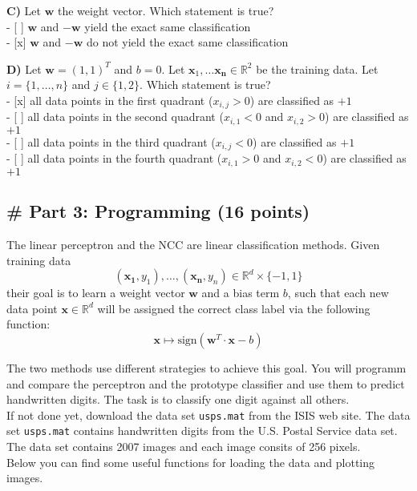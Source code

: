 \documentclass[11pt]{article}
\begin{document}
    \textbf{C)} Let \(\mathbf{w}\) the weight vector. Which statement is
true?\\
- {[} {]} \(\mathbf{w}\) and \(\mathbf{-w}\) yield the exact same
classification\\
- {[}x{]} \(\mathbf{w}\) and \(\mathbf{-w}\) do not yield the exact same
classification

    \textbf{D)} Let \(\mathbf{w} = (1,1)^T\) and \(b = 0\). Let
\(\mathbf{x}_1, \ldots \mathbf{x_n} \in \mathbb{R}^2\) be the training
data. Let \(i = \{1, \ldots ,n \}\) and \(j \in \{1, 2\}\). Which
statement is true?\\
- {[}x{]} all data points in the first quadrant (\(x_{i,j} > 0\)) are
classified as \(+1\)\\
- {[} {]} all data points in the second quadrant (\(x_{i,1} < 0\) and
\(x_{i,2} > 0\)) are classified as \(+1\)\\
- {[} {]} all data points in the third quadrant (\(x_{i,j} < 0\)) are
classified as \(+1\)\\
- {[} {]} all data points in the fourth quadrant (\(x_{i,1} > 0\) and
\(x_{i,2} < 0\)) are classified as \(+1\)

    \hypertarget{part-3-programming-16-points}{%
\subsection{\# Part 3: Programming (16
points)}\label{part-3-programming-16-points}}

The linear perceptron and the NCC are linear classification methods.
Given training data
\[(\mathbf{x_1}, y_1),\ldots, ( \mathbf{x_n}, y_n ) \in \mathbb{R}^d \times \{-1,1\}\]
their goal is to learn a weight vector \(\mathbf{w}\) and a bias term
\(b\), such that each new data point \(\mathbf{x} \in \mathbb{R}^d\)
will be assigned the correct class label via the following function:
\[\mathbf x \mapsto  \mbox{sign}(\mathbf w^T \cdot \mathbf x - b)\]

The two methods use different strategies to achieve this goal. You will
programm and compare the perceptron and the prototype classifier and use
them to predict handwritten digits. The task is to classify one digit
against all others.\\
If not done yet, download the data set \texttt{usps.mat} from the ISIS
web site. The data set \texttt{usps.mat} contains handwritten digits
from the U.S. Postal Service data set. The data set contains 2007 images
and each image consits of 256 pixels.\\
Below you can find some useful functions for loading the data and
plotting images.
\end{document}
